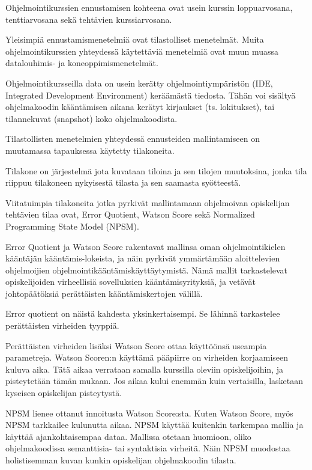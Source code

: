 \documentclass[finnish,twoside,openright]{HYgraduMLDS}
\begin{document}
Ohjelmointikurssien ennustamisen kohteena ovat usein kurssin loppuarvosana, tenttiarvosana sekä tehtävien kurssiarvosana. 

Yleisimpiä ennustamismenetelmiä ovat tilastolliset menetelmät\cite{hellas2018predicting}. Muita ohjelmointikurssien yhteydessä käytettäviä menetelmiä ovat muun muassa datalouhimis- ja koneoppimismenetelmät. 

Ohjelmointikursseilla data on usein kerätty ohjelmointiympäristön (IDE, Integrated Development Environment) keräämästä tiedosta. Tähän voi sisältyä ohjelmakoodin kääntämisen aikana kerätyt kirjaukset (ts. lokitukset), tai tilannekuvat (snapshot) koko ohjelmakoodista\cite{watson2013predicting, jadud2006methods, lagus2018transfer}.

Tilastollisten menetelmien yhteydessä ennusteiden mallintamiseen on muutamassa tapauksessa käytetty tilakoneita. 

Tilakone on järjestelmä jota kuvataan tiloina ja sen tilojen muutoksina, jonka tila riippuu tilakoneen nykyisestä tilasta ja sen saamasta syötteestä. 

Viitatuimpia tilakoneita jotka pyrkivät mallintamaan ohjelmoivan opiskelijan tehtävien tilaa ovat, Error Quotient\cite{jadud2006methods}, Watson Score\cite{watson2013predicting} sekä Normalized Programming State Model (NPSM)\cite{carter2015normalized}. 

Error Quotient ja Watson Score rakentavat mallinsa oman ohjelmointikielen kääntäjän kääntämis-lokeista, ja näin pyrkivät ymmärtämään aloittelevien ohjelmoijien ohjelmointikääntämiskäyttäytymistä. Nämä mallit tarkastelevat opiskelijoiden virheellisiä sovelluksien kääntämisyrityksiä, ja vetävät johtopäätöksiä perättäisten kääntämiskertojen välillä. 

Error quotient on näistä kahdesta yksinkertaisempi. Se lähinnä tarkastelee perättäisten virheiden tyyppiä. 

Perättäisten virheiden lisäksi Watson Score ottaa käyttöönsä useampia parametreja. Watson Scoren:n käyttämä pääpiirre on virheiden korjaamiseen kuluva aika. Tätä aikaa verrataan samalla kurssilla oleviin opiskelijoihin, ja pisteytetään tämän mukaan. Jos aikaa kului enemmän kuin vertaisilla, lasketaan kyseisen opiskelijan pisteytystä.

NPSM lienee ottanut innoitusta Watson Score:sta. Kuten Watson Score, myös NPSM tarkkailee kulunutta aikaa. NPSM käyttää kuitenkin tarkempaa mallia ja käyttää ajankohtaisempaa dataa. Mallissa otetaan huomioon, oliko ohjelmakoodissa semanttisia- tai syntaktisia virheitä. Näin NPSM muodostaa holistisemman kuvan kunkin opiskelijan ohjelmakoodin tilasta. 
\end{document}
